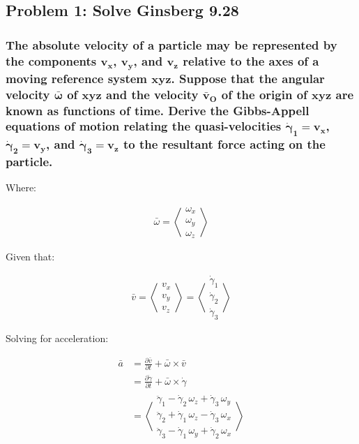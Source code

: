 \documentclass[12pt, letterpaper]{../assignment}
\begin{document}
\subsection*{Problem 1: Solve Ginsberg 9.28}
\subsubsection*{The absolute velocity of a particle may be represented by the components $\bm{v_x}$,
$\bm{v_y}$, and $\bm{v_z}$ relative to the axes of a moving reference system $\bm{xyz}$.
Suppose that the angular velocity $\bm{\bar{\omega}}$ of $\bm{xyz}$ and the velocity
$\bm{\bar{v}_O}$ of the origin of $\bm{xyz}$ are known as functions of time.
Derive the Gibbs-Appell equations of motion relating the quasi-velocities $\bm{\dot{\gamma}_1 = v_x}$, $\bm{\dot{\gamma}_2 = v_y}$,
and $\bm{\dot{\gamma}_3 = v_z}$ to the resultant force acting on the particle.}

Where:

$$ \bar{\omega} = 
\left<\begin{array}{c} \omega_x \\ \omega_y \\ \omega_z \end{array}\right>  $$

Given that:

$$ \bar{v} =
\left<\begin{array}{c} v_x \\ v_y \\ v_z \end{array}\right> =
\left<\begin{array}{c} \dot{\gamma}_{1}\\ \dot{\gamma}_{2}\\ \dot{\gamma}_{3} \end{array}\right> $$ 

Solving for acceleration:

\begin{equation*}
\begin{aligned}
    \bar{a} &= \frac{\partial \bar{v}}{\partial t} + \bar{\omega} \times \bar{v} \\
            &= \frac{\partial \dot{\gamma}}{\partial t} + \bar{\omega} \times \dot{\gamma} \\
            &= \left<\begin{array}{c}
{\ddot{\gamma}}_1 -{\dot{\gamma} }_2 \,\omega_z +{\dot{\gamma} }_3 \,\omega_y \\
{\ddot{\gamma}}_2 +{\dot{\gamma} }_1 \,\omega_z -{\dot{\gamma} }_3 \,\omega_x \\
{\ddot{\gamma}}_3 -{\dot{\gamma} }_1 \,\omega_y +{\dot{\gamma} }_2 \,\omega_x 
\end{array}\right>
\end{aligned}
\end{equation*}
\end{document}
